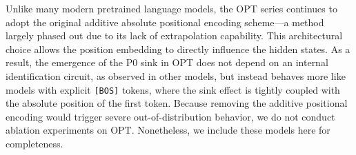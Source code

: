 \documentclass[]{template}
\theoremstyle{plain}
\theoremstyle{definition}
\theoremstyle{remark}
\begin{document}
Unlike many modern pretrained language models, the OPT series continues to adopt the original additive absolute positional encoding scheme—a method largely phased out due to its lack of extrapolation capability. This architectural choice allows the position embedding to directly influence the hidden states. As a result, the emergence of the P0 sink in OPT does not depend on an internal identification circuit, as observed in other models, but instead behaves more like models with explicit \texttt{[BOS]} tokens, where the sink effect is tightly coupled with the absolute position of the first token. Because removing the additive positional encoding would trigger severe out-of-distribution behavior, we do not conduct ablation experiments on OPT. Nonetheless, we include these models here for completeness.










\FloatBarrier


% 
\end{document}

